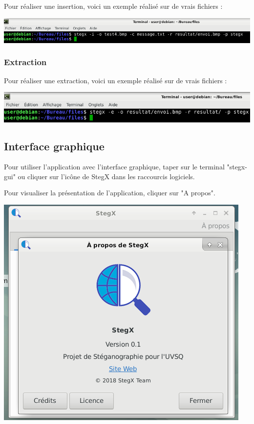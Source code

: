 \documentclass[11pt]{article}
\begin{document}
Pour réaliser une insertion, voici un exemple réalisé sur de vrais 
fichiers : 

\vspace{0.5cm}
\hspace{-2cm}
\includegraphics[scale=0.8]{pictures/insertion.png}
\vspace{1cm}

\subsubsection{Extraction}

Pour réaliser une extraction, voici un exemple réalisé sur de vrais 
fichiers :

\vspace{0.5cm}
\includegraphics[scale=0.8]{pictures/extraction.png}

\subsection{Interface graphique}

Pour utiliser l'application avec l'interface graphique, taper sur le 
terminal "stegx-gui" ou cliquer sur l'icône de StegX dans les raccourcis 
logiciels. 

Pour visualiser la présentation de l'application, cliquer sur "A propos". 

\vspace{0.5cm}
\hspace{2cm}
\includegraphics[scale=0.8]{pictures/a_propos.png}
\vspace{1cm}
\end{document}
